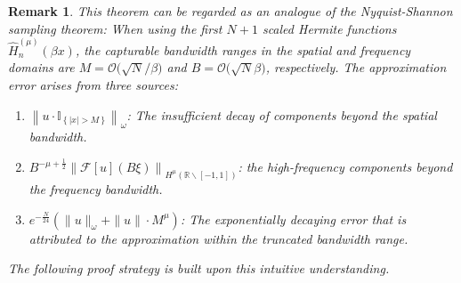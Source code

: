 \documentclass[pdflatex,sn-aps]{sn-jnl}%
\theoremstyle{thmstyleone}%
\theoremstyle{thmstyletwo}%
\newtheorem{remark}{Remark}%
\theoremstyle{thmstylethree}%
\begin{document}
\begin{remark}
  This theorem can be regarded as an analogue of the Nyquist-Shannon sampling theorem: 
  When using the first $N+1$ scaled Hermite functions $\widehat{H}_n^{(\mu)}(\beta x)$, the capturable bandwidth ranges in the spatial and frequency domains are $M = \mathcal{O}\bigl(\sqrt{N}/\beta\bigr)$ and $B = \mathcal{O}\bigl(\sqrt{N}\beta\bigr)$, respectively. 
  The approximation error arises from three sources: 
  \begin{enumerate}
    \item $\left\|u \cdot \mathbb{I}_{\left\{|x|>M\right\}}\right\|_\omega$:
    The insufficient decay of components beyond the spatial bandwidth.
    \item $B^{-\mu+\frac{1}{2}} \left\| \mathcal{F}[u]\left(B \xi\right) \right\|_{H^{\mu}\left(\mathbb{R}\backslash [-1,1]\right)}$:
    the high-frequency components beyond the frequency bandwidth.
    \item $e^{-\frac{N}{24}}\left(\|u\|_\omega+\|u\| \cdot M^\mu\right)$:
    The exponentially decaying error that is attributed to the approximation 
    within the truncated bandwidth range.
  \end{enumerate}
  The following proof strategy is built upon this intuitive understanding.
\end{remark}
\end{document}
